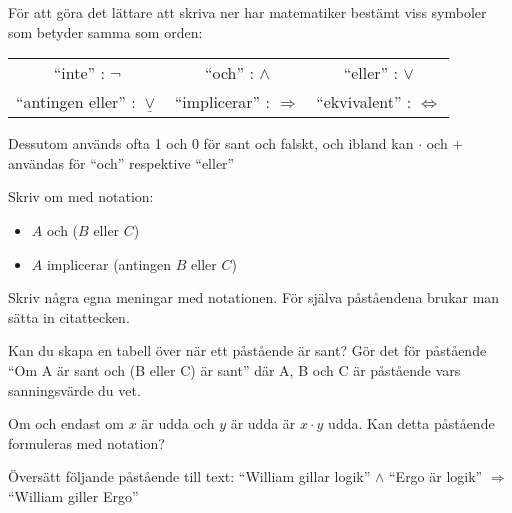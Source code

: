 \begin{definition}[Notation]
	För att göra det lättare att skriva ner har matematiker bestämt viss symboler som betyder samma som orden:
	\begin{center}
		\begin{tabular}{ c c c }
		 ``inte'' : \(\lnot\)  & ``och'' : \(\land\)  & ``eller'' : \(\lor\)  \\ 
		 ``antingen eller'' : \(\underline{\lor}\)  & ``implicerar'' : \(\Rightarrow\)  & ``ekvivalent'' : \(\Leftrightarrow \)  \\  
		\end{tabular}
	\end{center}
	Dessutom används ofta 1 och 0 för sant och falskt, och ibland kan \( \cdot \) och \(+\) användas för ``och'' respektive ``eller''
\end{definition}

\begin{problem}
	Skriv om med notation:
	\begin{itemize}
		\item \(A\) och (\(B\) eller \(C\))
		\item \(A\) implicerar (antingen \(B\) eller \(C\))
	\end{itemize}
\end{problem}

\begin{problem}
	Skriv några egna meningar med notationen. För själva påståendena brukar man sätta in citattecken.
\end{problem}

\begin{problem}[Extra]
	Kan du skapa en tabell över när ett påstående är sant? Gör det för påstående ``Om A är sant och (B eller C) är sant'' där A, B och C är påstående vars sanningsvärde du vet.
\end{problem}

\begin{problem}
	Om och endast om \(x\) är udda och \(y\) är udda är \(x  \cdot y\) udda. Kan detta påstående formuleras med notation?
\end{problem}

\begin{problem}
	Översätt följande påstående till text: ``William gillar logik'' \(\land\) ``Ergo är logik'' \(\Rightarrow \) ``William giller Ergo''
\end{problem}




